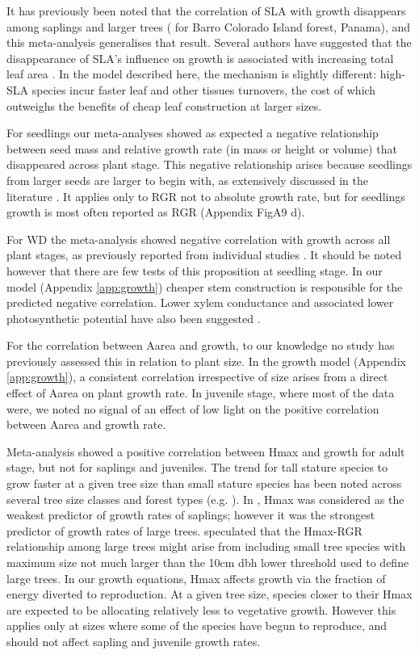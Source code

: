 \documentclass[a4paper]{article}\usepackage[]{graphicx}\usepackage[]{color}
\begin{document}
It has previously been noted that the correlation of SLA with growth disappears among saplings and larger trees (\citealt{Wright:2010tp} for Barro Colorado Island forest, Panama), and this meta-analysis generalises that result. Several authors have suggested that the disappearance of SLA's influence on growth is associated with increasing total leaf area \citep{Reich:1992wm,Poorter:2008iu,Wright:2010tp}. In the model described here, the mechanism is slightly different: high-SLA species incur faster leaf and other tissues turnovers, the cost of which outweighs the benefits of cheap leaf construction at larger sizes.

For seedlings our meta-analyses showed as expected a negative relationship between seed mass and relative growth rate (in mass or height or volume) that disappeared across plant stage. This negative relationship arises because seedlings from larger seeds are larger to begin with, as extensively discussed in the literature \citep[reviewed by][]{Turnbull:2012ew}. It applies only to RGR not to absolute growth rate, but for seedlings growth is most often reported as RGR (Appendix FigA9 d).

For WD the meta-analysis showed negative correlation with growth across all plant stages, as previously reported from individual studies \citep{Wright:2010tp,Ruger:2012jv}. It should be noted however that there are few tests of this proposition at seedling stage. In our model (Appendix \ref{app:growth}) cheaper stem construction is responsible for the predicted negative correlation. Lower xylem conductance and associated lower photosynthetic potential have also been suggested \citep[reviewed by][]{Chave:2009iy}.

For the correlation between Aarea and growth, to our knowledge no study has previously assessed this in relation to plant size. In the growth model (Appendix \ref{app:growth}), a consistent correlation irrespective of size arises from a direct effect of Aarea on plant growth rate. In juvenile stage, where most of the data were, we noted no signal of an effect of low light on the positive correlation between Aarea and growth rate.

Meta-analysis showed a positive correlation between Hmax and growth for adult stage, but not for saplings and juveniles. The trend for tall stature species to grow faster at a given tree size than small stature species has been noted across several tree size classes and forest types (e.g. \citealt{Poorter:2008iu,Wright:2010tp,Herault:2011dd,Ruger:2012jv,Iida:2014ep}). In \citet{Wright:2010tp}, Hmax was considered as the weakest predictor of growth rates of saplings; however it was the strongest predictor of growth rates of large trees. \citet{Poorter:2008iu} speculated that the Hmax-RGR relationship among large trees might arise from including small tree species with maximum size not much larger than the  10cm dbh lower threshold used to define large trees. In our growth equations, Hmax affects growth via the fraction of energy diverted to reproduction. At a given tree size, species closer to their Hmax are expected to be allocating relatively less to vegetative growth. However this applies only at sizes where some of the species have begun to reproduce, and should not affect sapling and juvenile growth rates.
\end{document}

